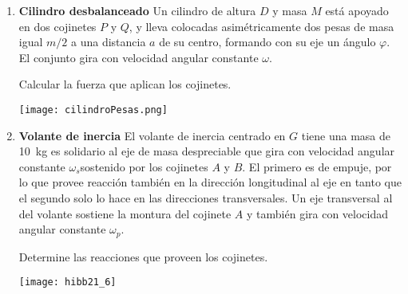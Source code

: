 \documentclass[11pt, spanish, a4paper, twoside]{article}
\begin{document}
\begin{enumerate}
	\item 
	\begin{minipage}[t][3.5cm]{0.6\textwidth}
	\textbf{Cilindro desbalanceado}
		Un cilindro de altura \(D\) y masa \(M\) está apoyado en dos cojinetes \(P\) y \(Q\), y lleva colocadas asimétricamente dos pesas de masa igual \(m/2\) a una distancia \(a\) de su centro, formando con su eje un ángulo \(\varphi\).
		El conjunto gira con velocidad angular constante \(\omega\).
		\begin{tasks} 
			\task Calcular la fuerza que aplican los cojinetes.
		\end{tasks}
	\end{minipage}
	\begin{minipage}[c][0.5cm][t]{0.35\textwidth}
		\texttt{[image: cilindroPesas.png]}
	\end{minipage}
	
	
	\item 
	\begin{minipage}[t][4.6cm]{0.6\textwidth}
		\textbf{Volante de inercia}
		El volante de inercia centrado en \(G\) tiene una masa de \SI{10}{\kilo\gram} es solidario al eje de masa despreciable que gira con velocidad angular constante \(\omega_s\)sostenido por los cojinetes \(A\) y \(B\).
		El primero es de empuje, por lo que provee reacción también en la dirección longitudinal al eje en tanto que el segundo solo lo hace en las direcciones transversales.
		Un eje transversal al del volante sostiene la montura del cojinete \(A\) y también gira con velocidad angular constante \(\omega_p\).
		\begin{tasks}
			\task Determine las reacciones que proveen los cojinetes.
		\end{tasks}
	\end{minipage}
	\begin{minipage}[c][0.5cm][t]{0.35\textwidth}
		\texttt{[image: hibb21\_6]}
	\end{minipage}




\end{enumerate}
\end{document}
